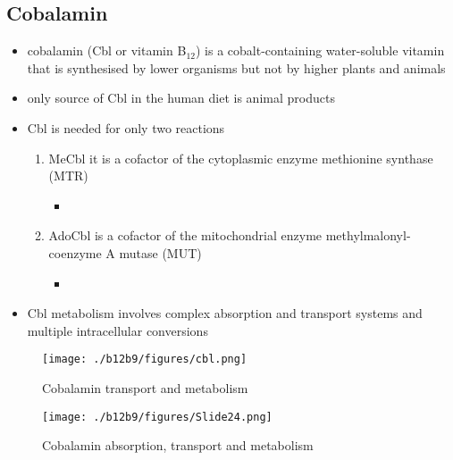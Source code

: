 \documentclass{scrartcl}
\begin{document}
\subsection{Cobalamin}
\label{sec:orgbdd5728}
\begin{itemize}
\item cobalamin (Cbl or vitamin B\(_{\text{12}}\)) is a cobalt-containing
water-soluble vitamin that is synthesised by lower organisms but not
by higher plants and animals
\item only source of Cbl in the human diet is animal products
\item Cbl is needed for only two reactions
\begin{enumerate}
\item MeCbl it is a cofactor of the cytoplasmic enzyme methionine synthase (MTR)
\begin{itemize}
\item {}
\end{itemize}
\item AdoCbl is a cofactor of the mitochondrial enzyme methylmalonyl-coenzyme A mutase (MUT)
\begin{itemize}
\item {}
\end{itemize}
\end{enumerate}
\item Cbl metabolism involves complex absorption and transport systems and
multiple intracellular conversions
\end{itemize}


\begin{figure}[htbp]
\centering
\texttt{[image: ./b12b9/figures/cbl.png]}
\caption{\label{fig:org2668234}
Cobalamin transport and metabolism}
\end{figure}

\begin{figure}[htbp]
\centering
\texttt{[image: ./b12b9/figures/Slide24.png]}
\caption{\label{fig:orgc7f3f06}
Cobalamin absorption, transport and metabolism}
\end{figure}
\end{document}
